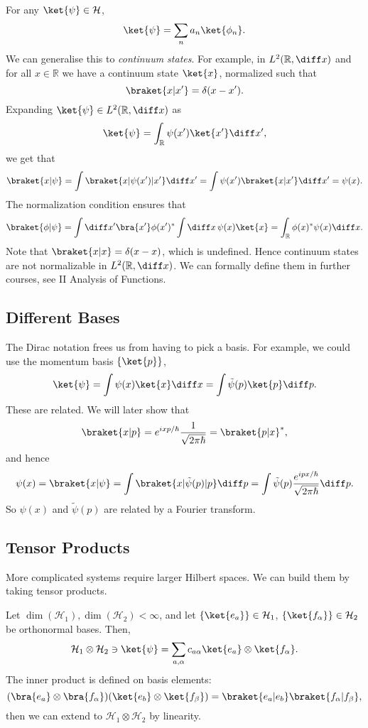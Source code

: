 \documentclass[12pt]{article}
\begin{document}
For any $\ket{\psi} \in \mathcal{H}$,
\[
	\ket{\psi} = \sum_{n} a_n \ket{\phi_n}.
\]
We can generalise this to \emph{continuum states}. For example, in $L^2(\mathbb{R}, \diff x)$ and for all $x \in \mathbb{R}$ we have a continuum state $\ket{x}$, normalized such that
\[
	\braket{x|x'} = \delta(x - x').
\]
Expanding $\ket{\psi} \in L^2(\mathbb{R}, \diff x)$ as
\[
	\ket{\psi} = \int_ \mathbb{R} \psi(x')\ket{x'} \diff x',
\]
we get that
\[
	\braket{x|\psi} = \int \braket{x |\psi(x')| x'}\diff x' = \int \psi(x') \braket{x|x'} \diff x' = \psi(x).
\]
The normalization condition ensures that
\[
	\braket{\phi|\psi} = \int \diff x' \bra{x'}\phi(x')^{\ast} \int \diff x\, \psi(x) \ket{x} = \int_ \mathbb{R} \phi(x)^{\ast} \psi(x) \diff x.
\]
Note that $\braket{x|x} = \delta(x - x)$, which is undefined. Hence continuum states are not normalizable in $L^2(\mathbb{R}, \diff x)$. We can formally define them in further courses, see II Analysis of Functions.

\subsection{Different Bases}
\label{sub:different_bases}

The Dirac notation frees us from having to pick a basis. For example, we could use the momentum basis $\{\ket{p}\}$,
\[
	\ket{\psi} = \int \psi(x) \ket{x} \diff x = \int \tilde \psi(p) \ket{p} \diff p.
\]
These are related. We will later show that
\[
	\braket{x|p} = e^{ixp/\hbar} \frac{1}{\sqrt{2\pi \hbar}} = \braket{p|x}^{\ast},
\]
and hence
\[
	\psi(x) = \braket{x|\psi} = \int \braket{x|\tilde \psi(p)|p} \diff p = \int \tilde \psi(p) \frac{e^{ipx/\hbar}}{\sqrt{2 \pi \hbar}} \diff p.
\]
So $\psi(x)$ and $\tilde \psi(p)$ are related by a Fourier transform.

\subsection{Tensor Products}
\label{sub:tensor_products}

More complicated systems require larger Hilbert spaces. We can build them by taking tensor products.

Let $\dim(\mathcal{H}_1), \dim(\mathcal{H}_2) < \infty$, and let $\{\ket{e_a}\} \in \mathcal{H}_1$, $\{\ket{f_\alpha}\} \in \mathcal{H}_2$ be orthonormal bases. Then,
\[
	\mathcal{H}_1 \otimes \mathcal{H}_2 \ni \ket{\psi} = \sum_{a,\alpha} c_{a\alpha}\ket{e_a} \otimes \ket{f_\alpha}.
\]
The inner product is defined on basis elements:
\[
	(\bra{e_a} \otimes \bra{f_\alpha}) (\ket{e_b} \otimes \ket{f_\beta}) = \braket{e_a|e_b} \braket{f_\alpha|f_\beta},
\]
then we can extend to $\mathcal{H}_1 \otimes \mathcal{H}_2$ by linearity.
\end{document}
